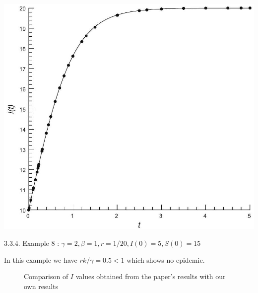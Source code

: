 \documentclass[10pt]{article}
\begin{document}
\begin{center}
\includegraphics[max width=\textwidth]{2024_05_07_79dc20a88ff3ef7ad507g-13(1)}
\end{center}
\newpage


3.3.4. Example 8 : $\gamma=2, \beta=1, r=1 / 20, I(0)=5, S(0)=15$

In this example we have $r k / \gamma=0.5<1$ which shows no epidemic. 


\begin{figure}[!htbp]
  \centering
  \hfill
  \caption{Comparison of \(I\) values obtained from the paper's results with our own results  }
\end{figure}
\end{document}
